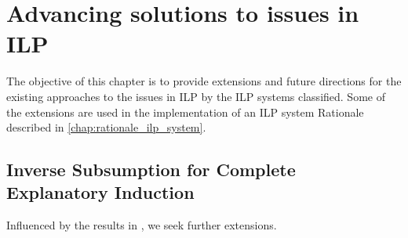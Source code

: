 \chapter{Advancing solutions to issues in ILP}\label{chap:advancing_solutions_to_issues_in_ilp}
The objective of this chapter is to provide extensions and future directions for the existing approaches to the issues in ILP by the ILP systems classified. Some of the extensions are used in the implementation of an ILP system Rationale described in \autoref{chap:rationale_ilp_system}.

\section{Inverse Subsumption for Complete Explanatory Induction}\cite{yamamoto2012inverse}
Influenced by the results in \cite{yamamoto2012inverse}, we seek further extensions.

